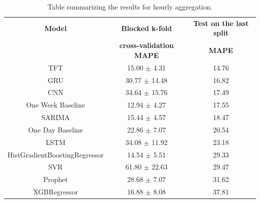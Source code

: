 \begin{table}[H]
\centering
\begin{tabular}{|c|c|c|}
\hline
\textbf{Model} & \textbf{Blocked k-fold} & \textbf{Test on the last split}\\
 & \textbf{cross-validation MAPE} & \textbf{MAPE}\\
\hline
TFT & 15.00 $\pm$ 4.31 & 14.76\\
\hline
GRU & 30.77 $\pm$ 14.48 & 16.82\\
\hline
CNN & 34.64 $\pm$ 15.76 & 17.49\\
\hline
One Week Baseline & 12.94 $\pm$ 4.27 & 17.55\\
\hline
SARIMA & 15.44 $\pm$ 4.57 & 18.47\\
\hline
One Day Baseline & 22.86 $\pm$ 7.07 & 20.54\\
\hline
LSTM & 34.08 $\pm$ 11.92 & 23.18\\
\hline
HistGradientBoostingRegressor & 14.54 $\pm$ 5.51 & 29.33\\
\hline
SVR & 61.80 $\pm$ 22.63 & 29.47\\
\hline
Prophet & 28.68 $\pm$ 7.07 & 31.62\\
\hline
XGBRegressor & 16.88 $\pm$ 8.08 & 37.81\\
\hline
\end{tabular}
\caption{Table summarizing the results for hourly aggregation.}
\label{tab:demandhourlyresults}
\end{table}


